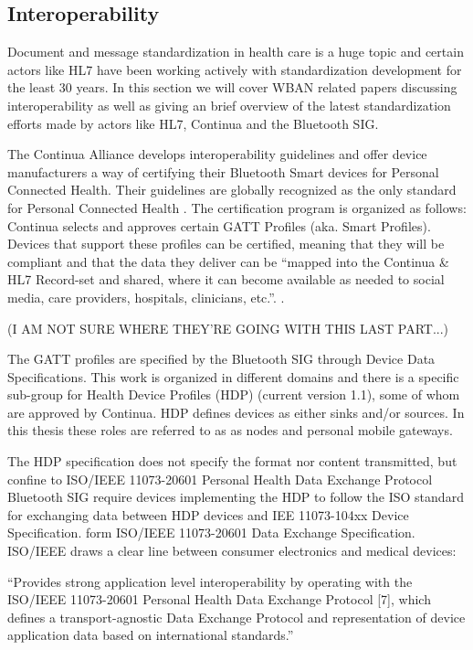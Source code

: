 
\subsection{Interoperability} %
\label{sub:interoperability}

Document and message standardization in health care is a huge topic and certain actors like HL7 have been working actively with standardization development for the least 30 years. In this section we will cover WBAN related papers discussing interoperability as well as giving an brief overview of the latest standardization efforts made by actors like HL7, Continua and the Bluetooth SIG.

The Continua Alliance develops interoperability guidelines and offer device manufacturers a way of certifying their Bluetooth Smart devices for Personal Connected Health. Their guidelines are globally recognized as the only standard for Personal Connected Health \cite{newRef_27}. The certification program is organized as follows: Continua selects and approves certain GATT Profiles (aka. Smart Profiles). Devices that support these profiles can be certified, meaning that they will be compliant and that the data they deliver can be ``mapped into the Continua & HL7 Record-set and shared, where it can become available as needed to social media, care providers, hospitals, clinicians, etc.''. \cite{newRef_27}.

(I AM NOT SURE WHERE THEY'RE GOING WITH THIS LAST PART...)

The GATT profiles are specified by the Bluetooth SIG through Device Data Specifications. This work is organized in different domains and there is a specific sub-group for Health Device Profiles (HDP) (current version 1.1), some of whom are approved by Continua. HDP defines devices as either sinks and/or sources. In this thesis these roles are referred to as as nodes and personal mobile gateways.

The HDP specification does not specify the format nor content transmitted, but confine to ISO/IEEE 11073-20601 Personal Health Data Exchange Protocol \cite{newRef_18} Bluetooth SIG require devices implementing the HDP to follow the ISO standard for exchanging data between HDP devices and IEE 11073-104xx Device Specification. form ISO/IEEE 11073-20601 Data Exchange Specification. ISO/IEEE draws a clear line between consumer electronics and medical devices: 

``Provides strong application level interoperability by operating with the ISO/IEEE 11073-20601 Personal Health Data Exchange Protocol [7], which defines a transport-agnostic Data Exchange Protocol and representation of device application data based on international standards.''


